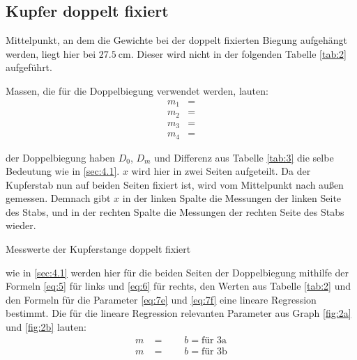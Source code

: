 
\subsection{Kupfer doppelt fixiert}\label{sec:4.2}

\justifying Mittelpunkt, an dem die Gewichte bei der doppelt fixierten Biegung aufgehängt werden, liegt hier bei 
$\SI{27.5}{\centi\meter}$. Dieser wird nicht in der folgenden Tabelle \ref{tab:2} aufgeführt.

\justifying Massen, die für die Doppelbiegung verwendet werden, lauten:
\begin{subequations}\label{eq:}
\begin{align}
    m_1 &= \text{} \label{eq:a}\\
    m_2 &= \text{} \label{eq:b}\\
    m_3 &= \text{} \label{eq:c}\\
    m_4 &= \text{} \label{eq:d}
\end{align}
\end{subequations}

\justifying der Doppelbiegung haben $D_0$, $D_m$ und Differenz aus Tabelle \ref{tab:3} die selbe Bedeutung wie in \ref{sec:4.1}.
$x$ wird hier in zwei Seiten aufgeteilt. Da der Kupferstab nun auf beiden Seiten fixiert ist, wird vom Mittelpunkt nach außen gemessen. Demnach
gibt $x$ in der linken Spalte die Messungen der linken Seite des Stabs, und in der rechten Spalte die Messungen der rechten Seite des Stabs wieder.
\begin{table}[H]
    \centering
    
    \caption{Messwerte der Kupferstange doppelt fixiert}
    \label{tab:3}
\end{table}

\justifying wie in \ref{sec:4.1} werden hier für die beiden Seiten der Doppelbiegung mithilfe der Formeln \eqref{eq:5} für
links und \eqref{eq:6} für rechts, den Werten aus Tabelle \ref{tab:2} und den Formeln für die Parameter \eqref{eq:7e} und \eqref{eq:7f} eine 
lineare Regression bestimmt. Die für die lineare Regression relevanten Parameter aus Graph \ref{fig:2a} und \ref{fig:2b} lauten:
\begin{subequations}\label{eq:}
\begin{align}
    m &= \text{} \qquad
    b = \text{}\label{eq:a} \text{für 3a}\\
    m &= \text{} \qquad
    b = \text{}\label{eq:b} \text{für 3b}
\end{align}
\end{subequations}

